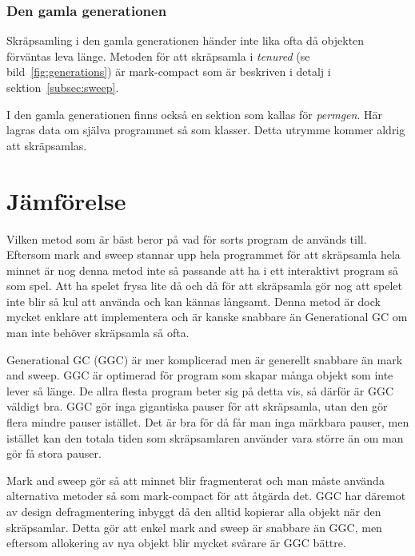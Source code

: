 \documentclass[12pt,a4paper]{article}
\begin{document}
\subsubsection{Den gamla generationen}
\label{subsubsec:gamla}

Skräpsamling i den gamla generationen händer inte lika ofta då objekten
förväntas leva länge. Metoden för att skräpsamla i \textit{tenured}
(se bild~\ref{fig:generations}) är mark-compact som är beskriven
i detalj i sektion~\ref{subsec:sweep}.

I den gamla generationen finns också en sektion som kallas för
\textit{permgen}. Här lagras data om själva programmet så som klasser.
Detta utrymme kommer aldrig att skräpsamlas.

\pagebreak
\section{Jämförelse}
\label{sec:compare}

Vilken metod som är bäst beror på vad för sorts program de används till.
Eftersom mark and sweep stannar upp hela programmet för att skräpsamla
hela minnet är nog denna metod inte så passande att ha i ett
interaktivt program så som spel. Att ha spelet frysa lite då och då
för att skräpsamla gör nog att spelet inte blir så kul att använda och
kan kännas långsamt. Denna metod är dock mycket enklare att
implementera och är kanske snabbare än Generational GC om man inte
behöver skräpsamla så ofta.

Generational GC (GGC) är mer komplicerad men är generellt snabbare än
mark and sweep. GGC är optimerad för program som skapar många objekt
som inte lever så länge. De allra flesta program beter sig på detta
vis, så därför är GGC väldigt bra. GGC gör inga gigantiska pauser för
att skräpsamla, utan den gör flera mindre pauser istället. Det är bra
för då får man inga märkbara pauser, men istället kan den totala tiden
som skräpsamlaren använder vara större än om man gör få stora pauser.

Mark and sweep gör så att minnet blir fragmenterat och man måste
använda alternativa metoder så som mark-compact för att åtgärda det.
GGC har däremot av design defragmentering inbyggt då den alltid
kopierar alla objekt när den skräpsamlar. Detta gör att enkel mark and
sweep är snabbare än GGC, men eftersom allokering av nya objekt blir
mycket svårare är GGC bättre.

\pagebreak
\end{document}
